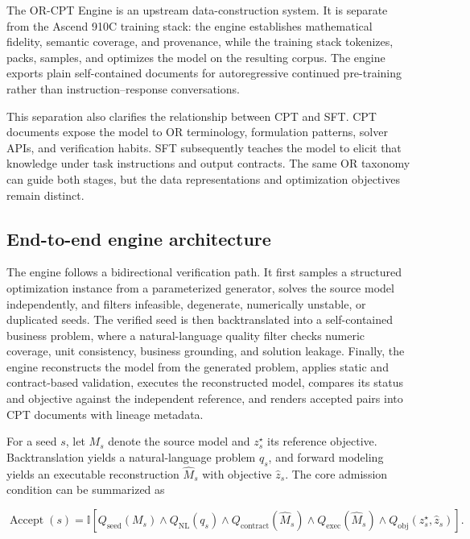 The OR-CPT Engine is an upstream data-construction system.  It is separate from
the Ascend 910C training stack: the engine establishes mathematical fidelity,
semantic coverage, and provenance, while the training stack tokenizes, packs,
samples, and optimizes the model on the resulting corpus.  The engine exports
plain self-contained documents for autoregressive continued pre-training rather
than instruction--response conversations.

This separation also clarifies the relationship between CPT and SFT.  CPT
documents expose the model to OR terminology, formulation patterns, solver APIs,
and verification habits.  SFT subsequently teaches the model to elicit that
knowledge under task instructions and output contracts.  The same OR taxonomy
can guide both stages, but the data representations and optimization objectives
remain distinct.

\subsection{End-to-end engine architecture}
\label{app:orcpt-architecture}

The engine follows a bidirectional verification path.  It first samples a
structured optimization instance from a parameterized generator, solves the
source model independently, and filters infeasible, degenerate, numerically
unstable, or duplicated seeds.  The verified seed is then backtranslated into a
self-contained business problem, where a natural-language quality filter checks
numeric coverage, unit consistency, business grounding, and solution leakage.
Finally, the engine reconstructs the model from the generated problem, applies
static and contract-based validation, executes the reconstructed model, compares
its status and objective against the independent reference, and renders accepted
pairs into CPT documents with lineage metadata.

For a seed $s$, let $M_s$ denote the source model and $z_s^\star$ its reference
objective.  Backtranslation yields a natural-language problem $q_s$, and forward
modeling yields an executable reconstruction $\widehat{M}_s$ with objective
$\widehat{z}_s$.  The core admission condition can be summarized as

\begin{equation}
  \operatorname{Accept}(s)=
  \mathbb{I}\!\left[
    Q_{\mathrm{seed}}(M_s)
    \land Q_{\mathrm{NL}}(q_s)
    \land Q_{\mathrm{contract}}(\widehat{M}_s)
    \land Q_{\mathrm{exec}}(\widehat{M}_s)
    \land Q_{\mathrm{obj}}(z_s^\star,\widehat{z}_s)
  \right].
  \label{eq:orcpt-acceptance}
\end{equation}


